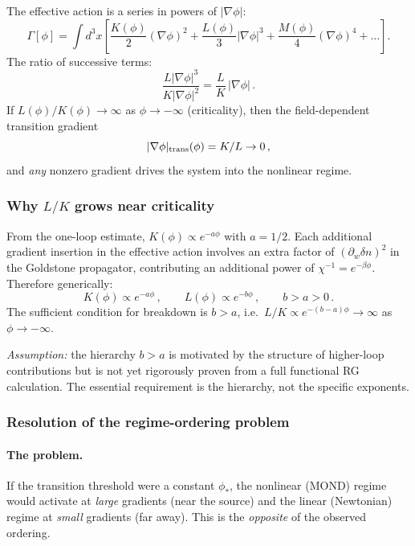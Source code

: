 \documentclass[11pt,a4paper]{article}
\numberwithin{equation}{section}
\begin{document}
The effective action is a series in powers of $|\nabla\phi|$:
\begin{equation}
\Gamma[\phi] = \int d^3x\left[
  \frac{K(\phi)}{2}(\nabla\phi)^2
  + \frac{L(\phi)}{3}|\nabla\phi|^3
  + \frac{M(\phi)}{4}(\nabla\phi)^4
  + \ldots
\right].
\end{equation}
The ratio of successive terms:
\begin{equation}
\frac{L|\nabla\phi|^3}{K|\nabla\phi|^2}
= \frac{L}{K}\,|\nabla\phi|\,.
\end{equation}
If $L(\phi)/K(\phi) \to \infty$ as $\phi \to -\infty$
(criticality), then the field-dependent transition gradient
\begin{equation}
|\nabla\phi|_{\rm trans}(\phi) = K/L \to 0\,,
\end{equation}
and \emph{any} nonzero gradient drives the system into the
nonlinear regime.

\subsubsection{Why $L/K$ grows near criticality}

From the one-loop estimate, $K(\phi) \propto e^{-a\phi}$ with
$a = 1/2$. Each additional gradient insertion in the effective
action involves an extra factor of $(\partial_w\delta n)^2$
in the Goldstone propagator, contributing an additional power of
$\chi^{-1} = e^{-\beta\phi}$. Therefore generically:
\begin{equation}
K(\phi) \propto e^{-a\phi}\,,
\qquad
L(\phi) \propto e^{-b\phi}\,,
\qquad b > a > 0\,.
\end{equation}
The sufficient condition for breakdown is $b > a$, i.e.\
$L/K \propto e^{-(b-a)\phi} \to \infty$ as $\phi \to -\infty$.

\emph{Assumption:} the hierarchy $b > a$ is motivated by the
structure of higher-loop contributions but is not yet rigorously
proven from a full functional RG calculation. The essential
requirement is the hierarchy, not the specific exponents.

\subsubsection{Resolution of the regime-ordering problem}
\label{app:lof:regime_ordering}

\paragraph{The problem.}
If the transition threshold were a constant $\phi_*$, the
nonlinear (MOND) regime would activate at \emph{large} gradients
(near the source) and the linear (Newtonian) regime at
\emph{small} gradients (far away). This is the \emph{opposite}
of the observed ordering.
\end{document}
